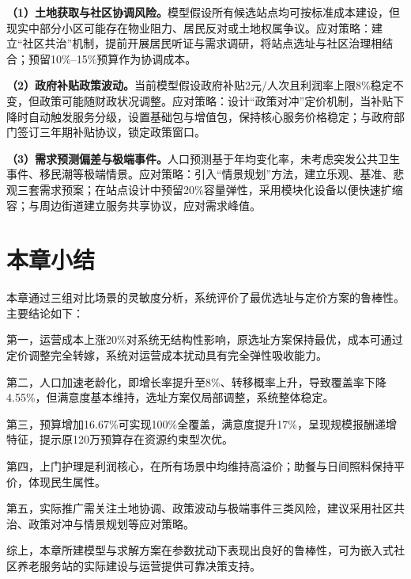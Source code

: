 \documentclass[12pt,a4paper]{article}
\begin{document}
\textbf{（1）土地获取与社区协调风险。}模型假设所有候选站点均可按标准成本建设，但现实中部分小区可能存在物业阻力、居民反对或土地权属争议。应对策略：建立``社区共治''机制，提前开展居民听证与需求调研，将站点选址与社区治理相结合；预留10\%--15\%预算作为协调成本。

\textbf{（2）政府补贴政策波动。}当前模型假设政府补贴2元/人次且利润率上限8\%稳定不变，但政策可能随财政状况调整。应对策略：设计``政策对冲''定价机制，当补贴下降时自动触发服务分级，设置基础包与增值包，保持核心服务价格稳定；与政府部门签订三年期补贴协议，锁定政策窗口。

\textbf{（3）需求预测偏差与极端事件。}人口预测基于年均变化率，未考虑突发公共卫生事件、移民潮等极端情景。应对策略：引入``情景规划''方法，建立乐观、基准、悲观三套需求预案；在站点设计中预留20\%容量弹性，采用模块化设备以便快速扩缩容；与周边街道建立服务共享协议，应对需求峰值。

\section{本章小结}

本章通过三组对比场景的灵敏度分析，系统评价了最优选址与定价方案的鲁棒性。主要结论如下：

第一，运营成本上涨20\%对系统无结构性影响，原选址方案保持最优，成本可通过定价调整完全转嫁，系统对运营成本扰动具有完全弹性吸收能力。

第二，人口加速老龄化，即增长率提升至8\%、转移概率上升，导致覆盖率下降4.55\%，但满意度基本维持，选址方案仅局部调整，系统整体稳定。

第三，预算增加16.67\%可实现100\%全覆盖，满意度提升17\%，呈现规模报酬递增特征，提示原120万预算存在资源约束型次优。

第四，上门护理是利润核心，在所有场景中均维持高溢价；助餐与日间照料保持平价，体现民生属性。

第五，实际推广需关注土地协调、政策波动与极端事件三类风险，建议采用社区共治、政策对冲与情景规划等应对策略。

综上，本章所建模型与求解方案在参数扰动下表现出良好的鲁棒性，可为嵌入式社区养老服务站的实际建设与运营提供可靠决策支持。
\end{document}

